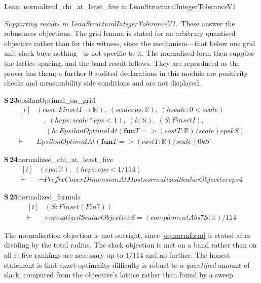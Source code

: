 \documentclass[conference]{IEEEtran}
\theoremstyle{definition}
\newcommand{\lean}[1]{\textsf{\footnotesize #1}}
\newcommand{\leanbox}[1]{%
  \par\vspace{2pt}\noindent
  {\footnotesize\textsf{Lean: #1}}\par\vspace{2pt}}
\begin{document}
\leanbox{\lean{normalized\_chi\_at\_least\_five} in
\lean{LeanStructuralIntegerToleranceV1}}

\noindent\emph{Supporting results in \lean{LeanStructuralIntegerToleranceV1}.}~These answer the robustness objections. The grid lemma is stated for an arbitrary quantised objective rather than for this witness, since the mechanism---that below one grid unit slack buys nothing---is not specific to it. The normalised form then supplies the lattice spacing, and the band result follows. They are reproduced as the prover has them; a further $0$ audited declarations in this module are positivity checks and measurability side conditions and are not displayed.

\noindent\textbf{S\,23}\quad\lean{epsilonOptimal\_on\_grid}
{\footnotesize\[ \begin{aligned}[t]
&(\mathit{cost} : \mathit{Finset} \mathit{I} \to \mathbb{N} ),\; (\mathit{scale} \mathit{eps} : \mathbb{R} ),\; (\mathit{hscale} : 0 < \mathit{scale})\\
&\quad ,\; (\mathit{heps} : \mathit{scale} * \mathit{eps} < 1),\; (\mathit{k} : \mathbb{N} ),\; (\mathit{S} : \mathit{Finset} \mathit{I}),\\
&\quad \; (\mathit{h} : \mathit{EpsilonOptimalAt} (\mathbf{fun} \mathit{T} => (\mathit{cost} \mathit{T}:\mathbb{R} )/\mathit{scale}) \mathit{eps} \mathit{k} \mathit{S})\\
\vdash\;&\mathit{EpsilonOptimalAt} (\mathbf{fun} \mathit{T} => (\mathit{cost} \mathit{T}:\mathbb{R} )/\mathit{scale}) 0 \mathit{k} \mathit{S}
\end{aligned} \]}

\noindent\textbf{S\,24}\quad\lean{normalized\_chi\_at\_least\_five}
{\footnotesize\[ \begin{aligned}[t]
&(\mathit{eps} : \mathbb{R} ),\; (\mathit{heps} : \mathit{eps} < 1/114)\\
\vdash\;&\neg \mathit{PrefixCoverDimensionAtMost} \mathit{normalizedScalarObjective} \mathit{eps} 4
\end{aligned} \]}

\noindent\textbf{S\,25}\quad\lean{normalized\_formula}
{\footnotesize\[ \begin{aligned}[t]
&(\mathit{S} : \mathit{Finset} (\mathit{Fin} 7))\\
\vdash\;&\mathit{normalizedScalarObjective} \mathit{S} = (\mathit{complementAbs7} \mathit{S}:\mathbb{R} )/114
\end{aligned} \]}


The normalisation objection is met outright, since \eqref{eq:normform} is stated after
dividing by the total radius. The slack objection is met on a band rather than on all
$\varepsilon$: five rankings are necessary up to $1/114$ and no further. The honest statement
is that exact-optimality difficulty is robust to a \emph{quantified} amount of slack,
computed from the objective's lattice rather than found by a sweep.
\end{document}
